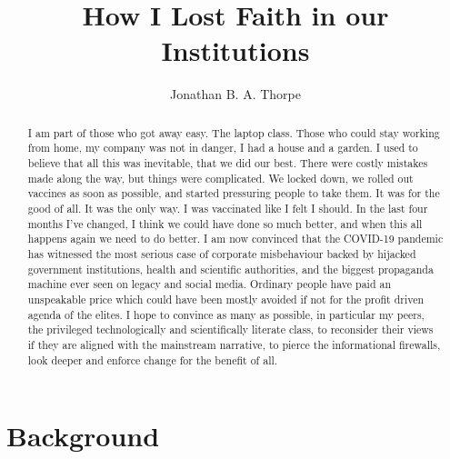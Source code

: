\documentclass[11pt,a4paper,notitlepage]{report}
\title{How I Lost Faith in our Institutions}
\author{Jonathan B. A. Thorpe}
\begin{document}
 

\begin{titlingpage}
\maketitle
\begin{abstract}
I am part of those who got away easy. The laptop class. Those who could stay working from home, my company was not in danger, I had a house and a garden. I used to believe that all this was inevitable, that we did our best. There were costly mistakes made along the way, but things were complicated. We locked down, we rolled out vaccines as soon as possible, and started pressuring people to take them. It was for the good of all. It was the only way. I was vaccinated like I felt I should. In the last four months I’ve changed, I think we could have done so much better, and when this all happens again we need to do better. I am now convinced that the COVID-19 pandemic has witnessed the most serious case of corporate misbehaviour backed by hijacked government institutions, health and scientific authorities, and the biggest propaganda machine ever seen on legacy and social media. Ordinary people have paid an unspeakable price which could have been mostly avoided if not for the profit driven agenda of the elites. I hope to convince as many as possible, in particular my peers, the privileged technologically and scientifically literate class, to reconsider their views if they are aligned with the mainstream narrative, to pierce the informational firewalls, look deeper and enforce change for the benefit of all. 
\end{abstract}
\end{titlingpage}

\section*{Background}
\end{document}
